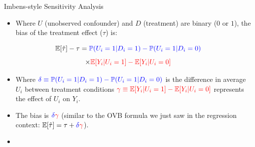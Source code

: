 \documentclass[ignorenonframetext,]{beamer}
\providecommand{\tightlist}{%
  \setlength{\itemsep}{0pt}\setlength{\parskip}{0pt}}
\begin{document}
\begin{frame}{Imbens-style Sensitivity Analysis}

\begin{itemize}
\tightlist
\item
  Where \(U\) (unobserved confounder) and \(D\) (treatment) are binary
  (\(0\) or \(1\)), the bias of the treatment effect (\(\tau\)) is:
\end{itemize}

\[\mathbb{E}[\hat{\tau}] - \tau = \color{blue}{\mathbb{P}(U_i = 1 | D_i = 1) - \mathbb{P}(U_i = 1 | D_i = 0)}\]
\[\times \color{red}{\mathbb{E}[Y_i| U_i = 1] - \mathbb{E}[Y_i| U_i = 0]}\]

\begin{itemize}
\item
  Where
  \(\color{blue}{\delta \equiv \mathbb{P}(U_i = 1 | D_i = 1) - \mathbb{P}(U_i = 1 | D_i = 0)}\)
  is the difference in average \(U_i\) between treatment conditions
  \(\color{red}{\gamma \equiv \mathbb{E}[Y_i| U_i = 1] - \mathbb{E}[Y_i| U_i = 0]}\)
  represents the effect of \(U_i\) on \(Y_i\).
\item
  The bias is \(\color{blue}{\delta}\color{red}{\gamma}\) (similar to
  the OVB formula we just saw in the regression context:
  \(\mathbb{E}[\hat{\tau}] = \tau + \color{blue}{\delta}\color{red}{\gamma}\)).
\item
  \color{red}{What assumption did we make for this to be true?}
\end{itemize}

\end{frame}
\end{document}
